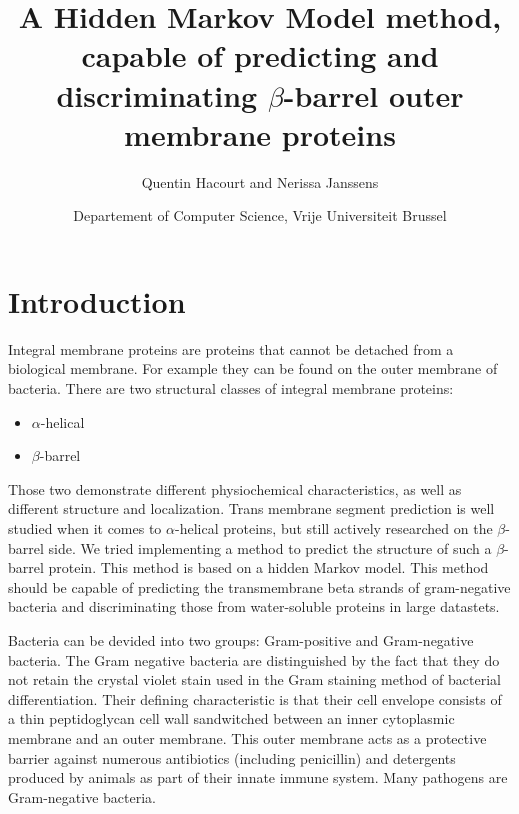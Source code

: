 \documentclass[
	a4paper, %
	11pt, %
	unnumberedsections, %
	twoside, %
  ]{LTJournalArticle}
\title{A Hidden Markov Model method, capable of predicting and discriminating $\beta$-barrel outer membrane proteins} %
\author{%
	Quentin Hacourt and Nerissa Janssens
}
\date{\footnotesize Departement of Computer Science, Vrije Universiteit Brussel\\}
\begin{document}
\nocite{*}
\maketitle %


\section{Introduction}


Integral membrane proteins are proteins that cannot be detached from a biological membrane. \cite{alberts_molecular_2007} For example they can be found on the outer membrane of bacteria. There are two structural classes of integral membrane proteins:

\begin{itemize}
        \item{$\alpha$-helical}
        \item{$\beta$-barrel}
\end{itemize}

Those two demonstrate different physiochemical characteristics, as well as different structure and localization. \cite{bagos_hidden_2004} Trans membrane segment prediction is well studied when it comes to $\alpha$-helical proteins, but still actively researched on the $\beta$-barrel side. \cite{bagos_hidden_2004} We tried implementing a method to predict the structure of such a $\beta$-barrel protein. This method is based on a hidden Markov model. \cite{bagos_hidden_2004} This method should be capable of predicting the transmembrane beta strands of gram-negative bacteria and discriminating those from water-soluble  proteins in large datastets.

Bacteria can be devided into two groups: Gram-positive and Gram-negative bacteria. The Gram negative bacteria are distinguished by the fact that they do not retain the crystal violet stain used in the Gram staining method of bacterial differentiation. Their defining characteristic is that their cell envelope consists of a thin peptidoglycan cell wall sandwitched between an inner cytoplasmic membrane and an outer membrane. This outer membrane acts as a protective barrier against numerous antibiotics (including penicillin) and detergents produced by animals as part of their innate immune system. Many pathogens are Gram-negative bacteria. \cite{bagos_hidden_2004}
\end{document}
